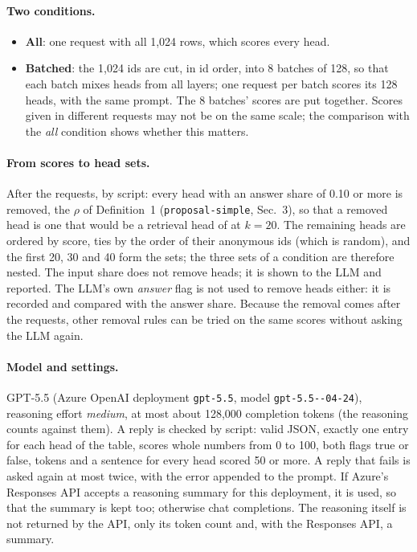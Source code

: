 \documentclass[11pt,a4paper]{article}
\newcommand{\simple}[1]{\texttt{proposal-simple}, #1}
\begin{document}
\paragraph{Two conditions.}
\begin{itemize}
  \item \textbf{All}: one request with all 1{,}024 rows, which scores every head.
  \item \textbf{Batched}: the 1{,}024 ids are cut, in id order, into 8 batches of 128, so that each batch mixes heads from all layers; one request per batch scores its 128 heads, with the same prompt. The 8 batches' scores are put together. Scores given in different requests may not be on the same scale; the comparison with the \emph{all} condition shows whether this matters.
\end{itemize}

\paragraph{From scores to head sets.} After the requests, by script: every head with an answer share of 0.10 or more is removed, the $\rho$ of Definition~1 (\simple{Sec.~3}), so that a removed head is one that would be a retrieval head of \citet{yang2026shared} at $k = 20$. The remaining heads are ordered by score, ties by the order of their anonymous ids (which is random), and the first 20, 30 and 40 form the sets; the three sets of a condition are therefore nested. The input share does not remove heads; it is shown to the LLM and reported. The LLM's own \emph{answer} flag is not used to remove heads either: it is recorded and compared with the answer share. Because the removal comes after the requests, other removal rules can be tried on the same scores without asking the LLM again.

\paragraph{Model and settings.} GPT-5.5 (Azure OpenAI deployment \texttt{gpt-5.5}, model \texttt{gpt-5.5--04-24}), reasoning effort \emph{medium}, at most about 128{,}000 completion tokens (the reasoning counts against them). A reply is checked by script: valid JSON, exactly one entry for each head of the table, scores whole numbers from 0 to 100, both flags true or false, tokens and a sentence for every head scored 50 or more. A reply that fails is asked again at most twice, with the error appended to the prompt. If Azure's Responses API accepts a reasoning summary for this deployment, it is used, so that the summary is kept too; otherwise chat completions. The reasoning itself is not returned by the API, only its token count and, with the Responses API, a summary.
\end{document}
